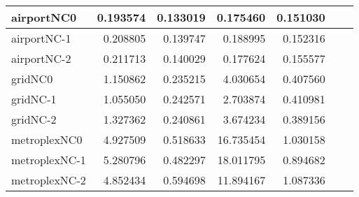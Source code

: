 \begin{longtable}{|l|r|r|r|r|r|r|}
airportNC0 & 0.193574 & 0.133019 & 0.175460 & 0.151030 \\ \hline
airportNC-1 & 0.208805 & 0.139747 & 0.188995 & 0.152316 \\ \hline
airportNC-2 & 0.211713 & 0.140029 & 0.177624 & 0.155577 \\ \hline
gridNC0 & 1.150862 & 0.235215 & 4.030654 & 0.407560 \\ \hline
gridNC-1 & 1.055050 & 0.242571 & 2.703874 & 0.410981 \\ \hline
gridNC-2 & 1.327362 & 0.240861 & 3.674234 & 0.389156 \\ \hline
metroplexNC0 & 4.927509 & 0.518633 & 16.735454 & 1.030158 \\ \hline
metroplexNC-1 & 5.280796 & 0.482297 & 18.011795 & 0.894682 \\ \hline
metroplexNC-2 & 4.852434 & 0.594698 & 11.894167 & 1.087336 \\ \hline
\end{longtable}

